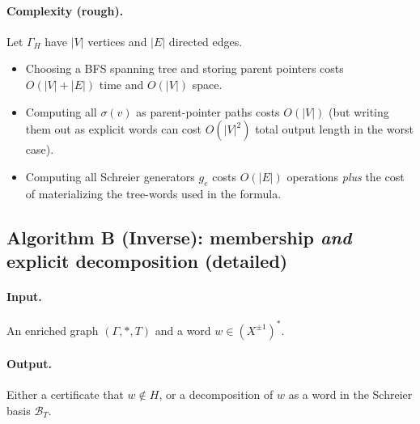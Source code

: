 \documentclass[11pt]{article}
\theoremstyle{definition}
\theoremstyle{plain}
\theoremstyle{remark}
\begin{document}
\paragraph{Complexity (rough).}\cite{schreier1927,hatcher2002,cormen2009}
Let $\Gamma_H$ have $|V|$ vertices and $|E|$ directed edges.
\begin{itemize}[leftmargin=2em]
\item Choosing a BFS spanning tree and storing parent pointers costs $O(|V|+|E|)$ time and $O(|V|)$ space.
\item Computing all $\sigma(v)$ as parent-pointer paths costs $O(|V|)$ (but writing them out as explicit words can cost $O(|V|^2)$ total output length in the worst case).
\item Computing all Schreier generators $g_e$ costs $O(|E|)$ operations \emph{plus} the cost of materializing the tree-words used in the formula.
\end{itemize}

\subsection*{Algorithm B (Inverse): membership \emph{and} explicit decomposition (detailed)}\cite{schreier1927,stallings1983,serre1980trees}
\paragraph{Input.} An enriched graph $(\Gamma,*,T)$ and a word $w\in (X^{\pm1})^*$.
\paragraph{Output.}
Either a certificate that $w\notin H$, or a decomposition of $w$ as a word in the Schreier basis $\mathcal B_T$.
\end{document}
